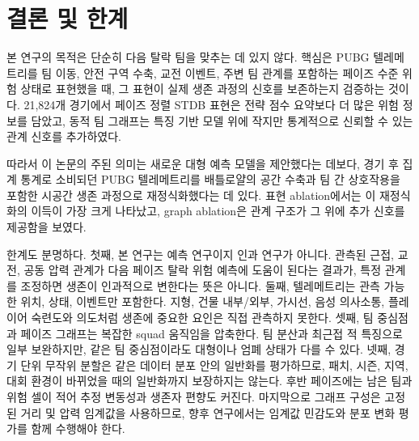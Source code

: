 \section{결론 및 한계}
\label{sec:limitations}

본 연구의 목적은 단순히 다음 탈락 팀을 맞추는 데 있지 않다. 핵심은 PUBG
텔레메트리를 팀 이동, 안전 구역 수축, 교전 이벤트, 주변 팀 관계를 포함하는
페이즈 수준 위험 상태로 표현했을 때, 그 표현이 실제 생존 과정의 신호를
보존하는지 검증하는 것이다. 21,824개 경기에서 페이즈 정렬 STDB 표현은 전략
점수 요약보다 더 많은 위험 정보를 담았고, 동적 팀 그래프는 특징 기반 모델
위에 작지만 통계적으로 신뢰할 수 있는 관계 신호를 추가하였다.

따라서 이 논문의 주된 의미는 새로운 대형 예측 모델을 제안했다는 데보다,
경기 후 집계 통계로 소비되던 PUBG 텔레메트리를 배틀로얄의 공간 수축과 팀 간
상호작용을 포함한 시공간 생존 과정으로 재정식화했다는 데 있다. 표현
ablation에서는 이 재정식화의 이득이 가장 크게 나타났고, graph ablation은
관계 구조가 그 위에 추가 신호를 제공함을 보였다.

한계도 분명하다. 첫째, 본 연구는 예측 연구이지 인과 연구가 아니다. 관측된
근접, 교전, 공동 압력 관계가 다음 페이즈 탈락 위험 예측에 도움이 된다는
결과가, 특정 관계를 조정하면 생존이 인과적으로 변한다는 뜻은 아니다. 둘째,
텔레메트리는 관측 가능한 위치, 상태, 이벤트만 포함한다. 지형, 건물
내부/외부, 가시선, 음성 의사소통, 플레이어 숙련도와 의도처럼 생존에 중요한
요인은 직접 관측하지 못한다. 셋째, 팀 중심점과 페이즈 그래프는 복잡한 squad
움직임을 압축한다. 팀 분산과 최근접 적 특징으로 일부 보완하지만, 같은 팀
중심점이라도 대형이나 엄폐 상태가 다를 수 있다. 넷째, 경기 단위 무작위
분할은 같은 데이터 분포 안의 일반화를 평가하므로, 패치, 시즌, 지역, 대회
환경이 바뀌었을 때의 일반화까지 보장하지는 않는다. 후반 페이즈에는 남은 팀과
위험 셀이 적어 추정 변동성과 생존자 편향도 커진다. 마지막으로 그래프 구성은
고정된 거리 및 압력 임계값을 사용하므로, 향후 연구에서는 임계값 민감도와
분포 변화 평가를 함께 수행해야 한다.
